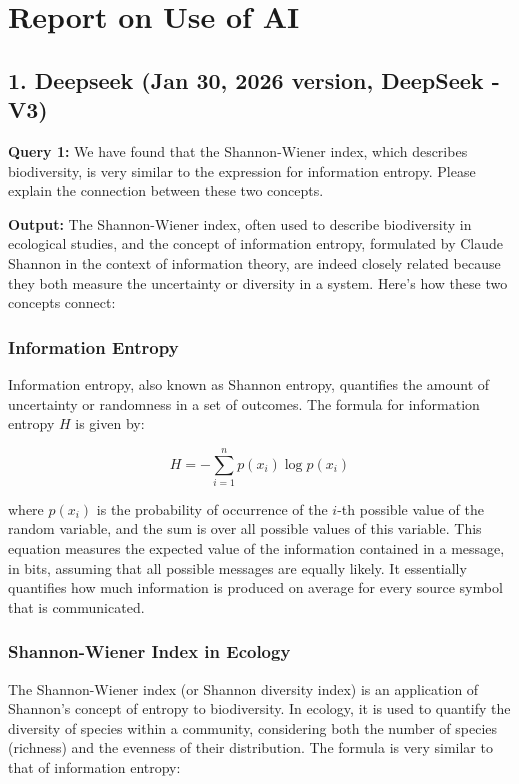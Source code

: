 \documentclass{mcmthesis}  %
\begin{document}
	
	\newpage
	\section*{\centering Report on Use of AI}
	
	\subsection*{1. Deepseek (Jan 30, 2026 version, DeepSeek - V3)}
	
	\textbf{Query 1:} 
	We have found that the Shannon-Wiener index, which describes biodiversity, is very similar to the expression for information entropy. Please explain the connection between these two concepts.
	
	\textbf{Output:} 
	The Shannon-Wiener index, often used to describe biodiversity in ecological studies, and the concept of information entropy, formulated by Claude Shannon in the context of information theory, are indeed closely related because they both measure the uncertainty or diversity in a system. Here's how these two concepts connect:
	
	\subsubsection*{Information Entropy}
	Information entropy, also known as Shannon entropy, quantifies the amount of uncertainty or randomness in a set of outcomes. The formula for information entropy \( H \) is given by:
	
	\[
	H = -\sum_{i = 1}^{n} p(x_i) \log p(x_i)
	\]
	
	where \( p(x_i) \) is the probability of occurrence of the \( i \)-th possible value of the random variable, and the sum is over all possible values of this variable. This equation measures the expected value of the information contained in a message, in bits, assuming that all possible messages are equally likely. It essentially quantifies how much information is produced on average for every source symbol that is communicated.
	
	\subsubsection*{Shannon-Wiener Index in Ecology}
	The Shannon-Wiener index (or Shannon diversity index) is an application of Shannon's concept of entropy to biodiversity. In ecology, it is used to quantify the diversity of species within a community, considering both the number of species (richness) and the evenness of their distribution. The formula is very similar to that of information entropy:
	
\end{document}
